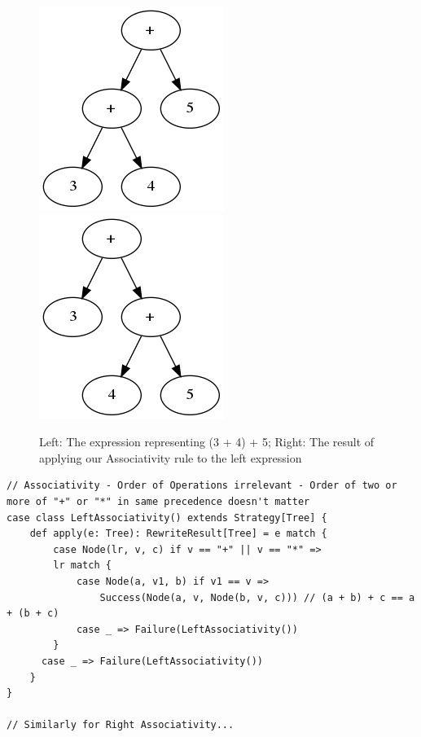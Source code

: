 \documentclass{l4proj}
\begin{document}
\begin{figure}
    \centering
    \includegraphics[scale=0.5]{images/Associativity0}
    \hspace{2cm}
    \includegraphics[scale=0.5]{images/Associativity1}
    \caption{Left: The expression representing (3 + 4) + 5; Right: The result of applying our Associativity rule to the left expression}
    \label{fig:Associativity_Example}
\end{figure}




\begin{lstlisting}
// Associativity - Order of Operations irrelevant - Order of two or more of "+" or "*" in same precedence doesn't matter
case class LeftAssociativity() extends Strategy[Tree] {
    def apply(e: Tree): RewriteResult[Tree] = e match {
        case Node(lr, v, c) if v == "+" || v == "*" =>
        lr match {
            case Node(a, v1, b) if v1 == v =>
                Success(Node(a, v, Node(b, v, c))) // (a + b) + c == a + (b + c)
            case _ => Failure(LeftAssociativity())
        }
      case _ => Failure(LeftAssociativity())
    }
}

// Similarly for Right Associativity...
\end{lstlisting}
\end{document}
